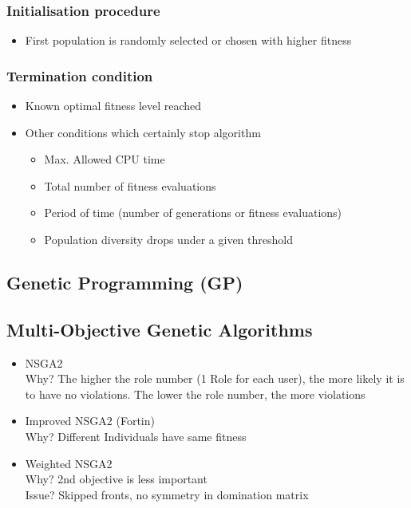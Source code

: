     \subsubsection{Initialisation procedure}
        \begin{itemize}
            \item First population is randomly selected or chosen with higher fitness 
        \end{itemize}
    \subsubsection{Termination condition}
        \begin{itemize}
            \item Known optimal fitness level reached
            \item Other conditions which certainly stop algorithm
            \begin{itemize}
                \item Max. Allowed CPU time
                \item Total number of fitness evaluations
                \item Period of time (number of generations or fitness evaluations)
                \item Population diversity drops under a given threshold
            \end{itemize}
        \end{itemize}
    
    \subsection{Genetic Programming (GP)}
    \subsection{Multi-Objective Genetic Algorithms}
    \begin{itemize}
        \item NSGA2\\
        Why? The higher the role number (1 Role for each user), the more likely it is to have no violations. The lower the role number, the more violations
        \item Improved NSGA2 (Fortin)\\
        Why? Different Individuals have same fitness
        \item Weighted NSGA2\\
        Why? 2nd objective is less important\\
        Issue? Skipped fronts, no symmetry in domination matrix
    \end{itemize}
    
